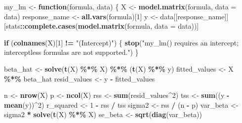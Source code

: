 \documentclass[11pt]{article}
\newenvironment{Shaded}{\begin{snugshade}}{\end{snugshade}}
\newcommand{\AttributeTok}[1]{\textcolor[rgb]{0.13,0.29,0.53}{#1}}
\newcommand{\ControlFlowTok}[1]{\textcolor[rgb]{0.13,0.29,0.53}{\textbf{#1}}}
\newcommand{\DecValTok}[1]{\textcolor[rgb]{0.00,0.00,0.81}{#1}}
\newcommand{\FunctionTok}[1]{\textcolor[rgb]{0.13,0.29,0.53}{\textbf{#1}}}
\newcommand{\NormalTok}[1]{#1}
\newcommand{\OtherTok}[1]{\textcolor[rgb]{0.56,0.35,0.01}{#1}}
\newcommand{\SpecialCharTok}[1]{\textcolor[rgb]{0.81,0.36,0.00}{\textbf{#1}}}
\newcommand{\StringTok}[1]{\textcolor[rgb]{0.31,0.60,0.02}{#1}}
\begin{document}
\begin{Shaded}
\begin{Highlighting}[]
\NormalTok{my\_lm }\OtherTok{\textless{}{-}} \ControlFlowTok{function}\NormalTok{(formula, data) \{}
\NormalTok{  X }\OtherTok{\textless{}{-}} \FunctionTok{model.matrix}\NormalTok{(formula, }\AttributeTok{data =}\NormalTok{ data)}
\NormalTok{  response\_name }\OtherTok{\textless{}{-}} \FunctionTok{all.vars}\NormalTok{(formula)[}\DecValTok{1}\NormalTok{]}
\NormalTok{  y }\OtherTok{\textless{}{-}}\NormalTok{ data[[response\_name]][stats}\SpecialCharTok{::}\FunctionTok{complete.cases}\NormalTok{(}\FunctionTok{model.matrix}\NormalTok{(formula, }\AttributeTok{data =}\NormalTok{ data))]}

  \ControlFlowTok{if}\NormalTok{ (}\FunctionTok{colnames}\NormalTok{(X)[}\DecValTok{1}\NormalTok{] }\SpecialCharTok{!=} \StringTok{"(Intercept)"}\NormalTok{) \{}
    \FunctionTok{stop}\NormalTok{(}\StringTok{"my\_lm() requires an intercept; interceptless formulas are not supported."}\NormalTok{)}
\NormalTok{  \}}

\NormalTok{  beta\_hat }\OtherTok{\textless{}{-}} \FunctionTok{solve}\NormalTok{(}\FunctionTok{t}\NormalTok{(X) }\SpecialCharTok{\%*\%}\NormalTok{ X) }\SpecialCharTok{\%*\%}\NormalTok{ (}\FunctionTok{t}\NormalTok{(X) }\SpecialCharTok{\%*\%}\NormalTok{ y)}
\NormalTok{  fitted\_values }\OtherTok{\textless{}{-}}\NormalTok{ X }\SpecialCharTok{\%*\%}\NormalTok{ beta\_hat}
\NormalTok{  resid\_values }\OtherTok{\textless{}{-}}\NormalTok{ y }\SpecialCharTok{{-}}\NormalTok{ fitted\_values}

\NormalTok{  n }\OtherTok{\textless{}{-}} \FunctionTok{nrow}\NormalTok{(X)}
\NormalTok{  p }\OtherTok{\textless{}{-}} \FunctionTok{ncol}\NormalTok{(X)}
\NormalTok{  rss }\OtherTok{\textless{}{-}} \FunctionTok{sum}\NormalTok{(resid\_values}\SpecialCharTok{\^{}}\DecValTok{2}\NormalTok{)}
\NormalTok{  tss }\OtherTok{\textless{}{-}} \FunctionTok{sum}\NormalTok{((y }\SpecialCharTok{{-}} \FunctionTok{mean}\NormalTok{(y))}\SpecialCharTok{\^{}}\DecValTok{2}\NormalTok{)}
\NormalTok{  r\_squared }\OtherTok{\textless{}{-}} \DecValTok{1} \SpecialCharTok{{-}}\NormalTok{ rss }\SpecialCharTok{/}\NormalTok{ tss}
\NormalTok{  sigma2 }\OtherTok{\textless{}{-}}\NormalTok{ rss }\SpecialCharTok{/}\NormalTok{ (n }\SpecialCharTok{{-}}\NormalTok{ p)}
\NormalTok{  var\_beta }\OtherTok{\textless{}{-}}\NormalTok{ sigma2 }\SpecialCharTok{*} \FunctionTok{solve}\NormalTok{(}\FunctionTok{t}\NormalTok{(X) }\SpecialCharTok{\%*\%}\NormalTok{ X)}
\NormalTok{  se\_beta }\OtherTok{\textless{}{-}} \FunctionTok{sqrt}\NormalTok{(}\FunctionTok{diag}\NormalTok{(var\_beta))}


\end{Highlighting}
\end{Shaded}
\end{document}
